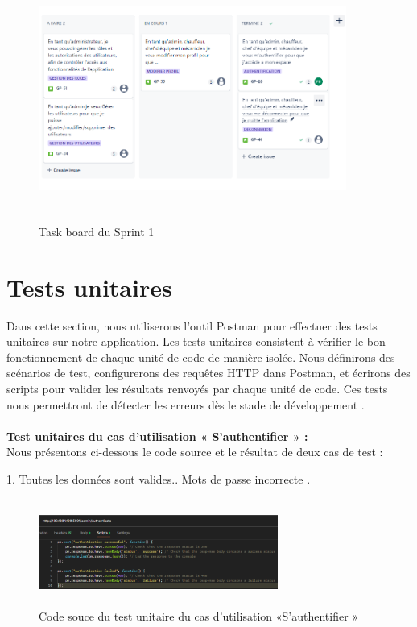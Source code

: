 \begin{figure}[ht!]
  \centering
  \includegraphics[width=0.9\textwidth, height=8cm]{chap3.images/task board sprint 1.png}
  \caption{ Task board du Sprint 1 }

\end{figure}
\section{Tests unitaires}
Dans cette section, nous utiliserons l'outil Postman pour effectuer des tests unitaires sur notre application. Les tests unitaires consistent à vérifier le bon fonctionnement de chaque unité de code de manière isolée. Nous définirons des scénarios de test, configurerons des requêtes HTTP dans Postman, et écrirons des scripts pour valider les résultats renvoyés par chaque unité de code. Ces tests nous permettront de détecter les erreurs dès le stade de développement .\\\\
\bigskip
\textbf{Test unitaires du cas d’utilisation « S'authentifier » :}\\
Nous présentons ci-dessous le code source et le résultat de deux cas de test :

1. Toutes les données sont valides.. Mots de passe incorrecte .

\begin{figure}[ht!]
  \centering
  \includegraphics[width=0.7\textwidth, height=3.5cm]{chap3.images/code source test.png}
  \caption{ Code souce du test unitaire du cas d’utilisation «S’authentifier » }

\end{figure}

